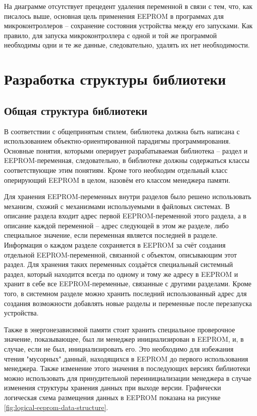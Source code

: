 На диаграмме отсутствует прецедент удаления переменной в связи с тем, что, как писалось выше, основная цель применения EEPROM в программах для  микроконтроллеров -- сохранение состояния устройства между его запусками.
Как правило, для запуска микроконтроллера с одной и той же программой необходимы одни и те же данные, следовательно, удалять их нет необходимости.

\section{Разработка структуры библиотеки}

\subsection{Общая структура библиотеки} \label{subsection:library-structure}

В соответствии с общепринятым стилем, библиотека должна быть написана с использованием объектно-ориентированной парадигмы программирования.
Основные понятия, которыми оперирует разрабатываемая библиотека -- раздел и EEPROM-переменная, следовательно, в библиотеке должны содержаться классы соответствующие этим понятиям.
Кроме того необходим отдельный класс оперирующий EEPROM в целом, назовём его классом менеджера памяти.

Для хранения EEPROM-переменных внутри разделов было решено использовать механизм, схожий с механизмами используемыми в файловых системах.
В описание раздела входит адрес первой EEPROM-переменной этого раздела, а в описание каждой переменной -- адрес следующей в этом же разделе, либо специальное значение, если переменная является последней в разделе.
Информация о каждом разделе сохраняется в EEPROM за счёт создания отдельной EEPROM-переменной, связанной с объектом, описывающим этот раздел.
Для хранения таких переменных создаётся специальный системный раздел, который находится всегда по одному и тому же адресу в EEPROM и хранит в себе все EEPROM-переменные, связанные с другими разделами.
Кроме того, в системном разделе можно хранить последний использованный адрес для создания возможности добавлять новые разделы и переменные после перезапуска устройства.

Также в энергонезависимой памяти стоит хранить специальное проверочное значение, показывающее, был ли менеджер инициализирован в EEPROM, и, в случае, если не был, инициализировать его.
Это необходимо для избежания чтения "мусорных" данный, находящихся в EEPROM до первого использования менеджера.
Также изменение этого значения в последующих версиях библиотеки можно использовать для принудительной переинициализации менеджера в случае изменения структуры хранения данных при выходе версии.
Графически логическая схема размещения данных в EEPROM показана на рисунке \ref{fig:logical-eeprom-data-structure}.

